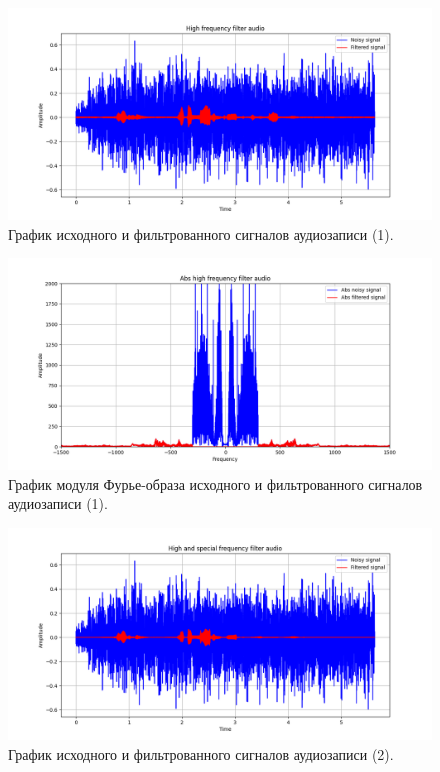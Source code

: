 \documentclass[a4paper, 12pt]{article}
\begin{document}
    \begin{figure}[!htb]
        \centering
        \includegraphics[scale=0.48]{u_flt_u_audio.png}
        \captionsetup{skip=0pt}
        \caption{График исходного и фильтрованного сигналов аудиозаписи (1).}
        \label{fig:fig113}
    \end{figure}
    \begin{figure}[!htb]
        \centering
        \includegraphics[scale=0.48]{abs_u_U_audio.png}
        \captionsetup{skip=0pt}
        \caption{График модуля Фурье-образа исходного и фильтрованного сигналов аудиозаписи (1).}
        \label{fig:fig114}
    \end{figure}
    \begin{figure}[!htb]
        \centering
        \includegraphics[scale=0.48]{u_flt_u_audio_v2.png}
        \captionsetup{skip=0pt}
        \caption{График исходного и фильтрованного сигналов аудиозаписи (2).}
        \label{fig:fig115}
    \end{figure}
\end{document}
